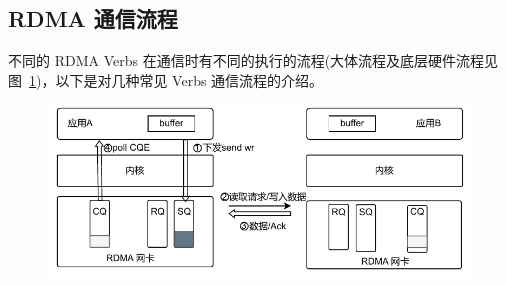 {    %


    \newpage
    \subsection{RDMA 通信流程}\label{sec:process}
    不同的 RDMA Verbs 在通信时有不同的执行的流程(大体流程及底层硬件流程见图~\ref{fig:rdma-Read})，以下是对几种常见 Verbs 通信流程的介绍。

    \begin{figure}[!htbp]
        \centering
        \includegraphics[width=\linewidth]{Img/RDMA-Read通信流程图.drawio.pdf}
        \label{fig:rdma-Read}
    \end{figure}

}
